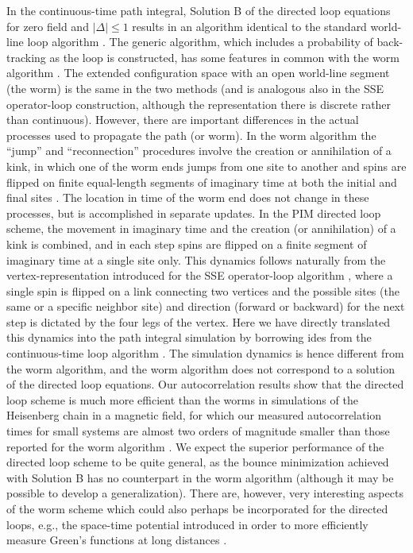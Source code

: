 \documentclass[10pt,pre,aps,twocolumn,showpacs,superscriptaddress,
floatfix]{revtex4}
\begin{document}
In the continuous-time path integral, Solution B of the directed loop 
equations for zero field and $|\Delta| \le 1$ results in an algorithm 
identical to the standard world-line loop algorithm \cite{beard,evertzchapter}.
The generic algorithm, which includes a probability of back-tracking as the
loop is constructed, has some features in common with the worm algorithm
\cite{prokofev}. The extended configuration space with an open world-line 
segment (the worm) is the same in the two methods (and is analogous also in 
the SSE operator-loop construction, although the representation there is
discrete rather than continuous). However, there are important differences 
in the actual processes used to propagate the path (or worm). In the worm 
algorithm the ``jump'' and ``reconnection'' procedures involve the creation 
or annihilation of a kink, in which one of the worm ends jumps from one site 
to another and spins are flipped on finite equal-length segments of imaginary 
time at both the initial and final sites \cite{prokofev}. The location in 
time of the worm end does not change in these processes, but is accomplished 
in separate updates. In the PIM directed loop scheme, the movement in imaginary
time and the creation (or annihilation) of a kink is combined, and in each 
step spins are flipped on a finite segment of imaginary time at a single site 
only. This dynamics follows naturally from the vertex-representation 
introduced for the SSE operator-loop algorithm \cite{sse3}, where a single 
spin is flipped on a link connecting two vertices and the possible sites 
(the same or a specific neighbor site) and direction (forward or backward) 
for the next step is dictated by the four legs of the vertex. Here we have 
directly translated this dynamics into the path integral simulation by 
borrowing ides from the continuous-time loop algorithm \cite{beard}. The 
simulation dynamics is hence different from the worm algorithm, and the worm 
algorithm does not correspond to a solution of the directed loop equations. 
Our autocorrelation results show that the directed loop scheme is much more 
efficient than the worms in simulations of the Heisenberg chain in a magnetic 
field, for which our measured autocorrelation times for small systems are 
almost two orders of magnitude smaller than those reported  for the worm 
algorithm \cite{kashurnikov}. We expect the superior performance of the
directed loop scheme to be quite general, as the bounce minimization
achieved with Solution B has no counterpart in the worm algorithm (although
it may be possible to develop a generalization). There are, however, very 
interesting aspects of the worm scheme which could also perhaps be 
incorporated for the directed loops, e.g., the space-time potential 
introduced in order to more efficiently measure Green's functions at 
long distances \cite{prokofev}.
\end{document}
